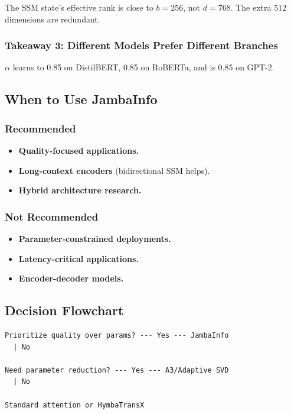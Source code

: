 The SSM state's effective rank is close to $b = 256$, not $d = 768$. The 
extra 512 dimensions are redundant.

\subsubsection{Takeaway 3: Different Models Prefer Different Branches}

$\alpha$ learns to 0.85 on DistilBERT, 0.85 on 
RoBERTa, and is 0.85 on GPT-2.

\subsection{When to Use JambaInfo}

\subsubsection{Recommended}
\begin{itemize}
\item \textbf{Quality-focused applications.}
\item \textbf{Long-context encoders} (bidirectional SSM helps).
\item \textbf{Hybrid architecture research.}

\end{itemize}
\subsubsection{Not Recommended}
\begin{itemize}
\item \textbf{Parameter-constrained deployments.}
\item \textbf{Latency-critical applications.}
\item \textbf{Encoder-decoder models.}

\end{itemize}
\subsection{Decision Flowchart}

\begin{lstlisting}
Prioritize quality over params? --- Yes --- JambaInfo
  | No
   
Need parameter reduction? --- Yes --- A3/Adaptive SVD
  | No
   
Standard attention or HymbaTransX
\end{lstlisting}

